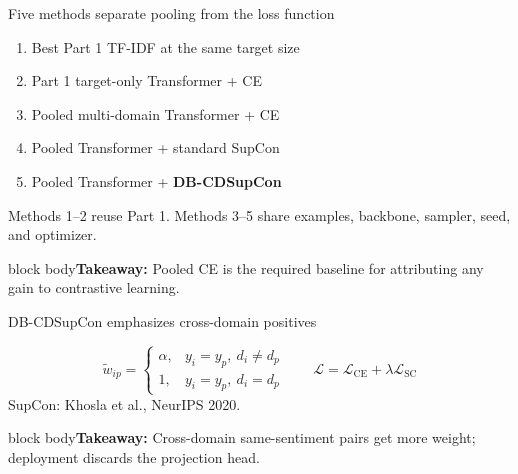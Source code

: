 \documentclass[aspectratio=169,12pt]{beamer}
\newcommand{\takeaway}[1]{\vfill\begin{beamercolorbox}[sep=5pt,wd=\linewidth]{block body}\normalsize\textbf{Takeaway:} #1\end{beamercolorbox}}
\begin{document}
\begin{frame}{Five methods separate pooling from the loss function}
  \begin{enumerate}
    \item Best Part 1 TF-IDF at the same target size
    \item Part 1 target-only Transformer + CE
    \item Pooled multi-domain Transformer + CE
    \item Pooled Transformer + standard SupCon
    \item Pooled Transformer + \textbf{DB-CDSupCon}
  \end{enumerate}
  \vspace{3mm}
  \centering
  \small Methods 1--2 reuse Part 1. Methods 3--5 share examples, backbone, sampler, seed, and optimizer.
  \takeaway{Pooled CE is the required baseline for attributing any gain to contrastive learning.}
\end{frame}

\begin{frame}{DB-CDSupCon emphasizes cross-domain positives}
  \centering
  \vspace{5mm}
  \[
    \tilde w_{ip}=
    \begin{cases}
      \alpha,&y_i=y_p,\ d_i\neq d_p\\
      1,&y_i=y_p,\ d_i=d_p
    \end{cases}
    \qquad
    \mathcal L=\mathcal L_{\mathrm{CE}}+\lambda\mathcal L_{\mathrm{SC}}
  \]
  \scriptsize SupCon: Khosla et al., NeurIPS 2020.
  \takeaway{Cross-domain same-sentiment pairs get more weight; deployment discards the projection head.}
\end{frame}
\end{document}
